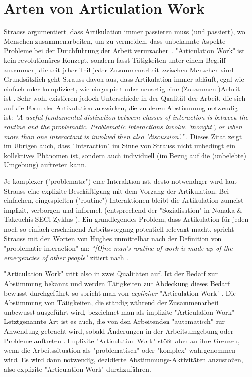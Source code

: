 \section{Arten von Articulation Work} %
\label{sec:arten_von_articulation_work}

Strauss argumentiert, dass Artikulation immer passieren muss (und passiert), wo Menschen zusammenarbeiten, um zu vermeiden, dass unbekannte Aspekte Probleme bei der Durchführung der Arbeit verursachen \citep{Strauss88}. "Articulation Work" ist kein revolutionäres Konzept, sondern fasst Tätigkeiten unter einem Begriff zusammen, die seit jeher Teil jeder Zusammenarbeit zwischen Menschen sind. Grundsätzlich geht Strauss davon aus, dass Artikulation immer abläuft, egal wie einfach oder kompliziert, wie eingespielt oder neuartig eine (Zusammen-)Arbeit ist \citep{Strauss88}. Sehr wohl existieren jedoch Unterschiede in der Qualität der Arbeit, die sich auf die Form der Artikulation auswirken, die zu deren Abstimmung notwendig ist: \emph{"A useful fundamental distinction between classes of interaction is between the routine and the problematic. Problematic interactions involve 'thought', or when more than one interactant is involved then also 'discussion'."} \citep{Strauss93}. Dieses Zitat zeigt im Übrigen auch, dass "Interaction" im Sinne von Strauss nicht unbedingt ein kollektives Phänomen ist, sondern auch individuell (im Bezug auf die (unbelebte) Umgebung) auftreten kann.

Je komplexer ("problematic") eine Interaktion ist, desto notwendiger wird laut Strauss eine explizite Beschäftigung mit dem Vorgang der Artikulation. Bei einfachen, eingespielten ("routine") Interaktionen bleibt die Artikulation zumeist implizit, verborgen und informell \citep{Hampson05} (entsprechend der "Sozialisation" in Nonaka & Takeuchis SECI-Zyklus \citep{Nonaka95}). Ein grundlegendes Problem, dass Artikulation für jeden noch so einfach erscheinend Arbeitsvorgang potentiell relevant macht, spricht Strauss mit den Worten von Hughes unmittelbar nach der Definition von "problematic interaction" an: \emph{"[O]ne man's routine of work is made up of the emergencies of other people"} \citep{Hughes71} zitiert nach \citep{Strauss93}.

"Articulation Work" tritt also in zwei Qualitäten auf. Ist der Bedarf zur Abstimmung bekannt und werden Tätigkeiten zur Abdeckung dieses Bedarf bewusst durchgeführt, so spricht man von \emph{expliziter} "Articulation Work" \citep{Strauss88}\citep{Fjuk97}. Die Abstimmung von Tätigkeiten, die ständig während der Zusammenarbeit unbewusst ausgeführt wird, bezeichnet man als implizite "Articulation Work". Letztgenannte Art ist es auch, die von den Arbeitenden "automatisch" zur Anwendung gebracht wird, sobald Änderungen in der Arbeitsumgebung oder Probleme auftreten \citep{Strauss88}. Implizite "Articulation Work" stößt aber an ihre Grenzen, wenn die Arbeitssituation als "problematisch" \citep{Strauss88} oder "komplex" \citep[][S. 23f]{Schmidt90} wahrgenommen wird. Es wird dann notwendig, dezidierte Abstimmungs-Aktivitäten anzustoßen, also explizite "Articulation Work" durchzuführen.

